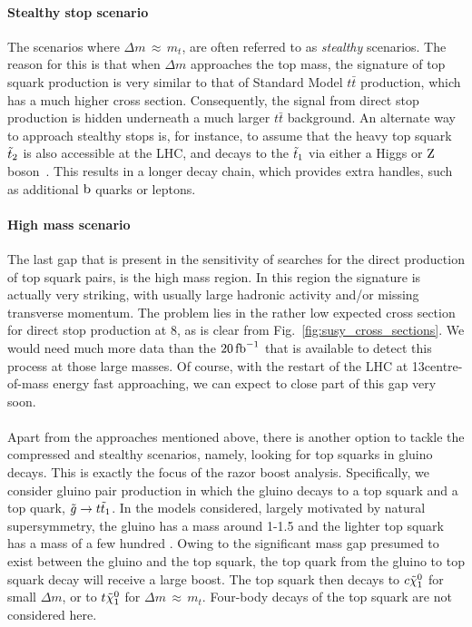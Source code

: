 \paragraph{Stealthy stop scenario}
The scenarios where $\Delta m\,{\approx}\, m_t$, are often referred to as \textit{stealthy}
scenarios. The reason for this is that when $\Delta m$ approaches the top mass, the signature of
top squark production is very similar to that of Standard Model $t\bar{t}$ production,
which has a much higher cross section. Consequently, the signal from direct stop production is
hidden underneath a much larger $t\bar{t}$ background. An alternate way to approach stealthy stops
is, for instance, to assume that the heavy top squark $\tilde{t}_2$ is also accessible at the LHC, and
decays to the $\tilde{t}_1$ via either a Higgs or $\mathrm{Z}$ boson~\cite{Khachatryan:2014doa}. This
results in a longer decay chain, which provides extra handles, such as additional $\mathrm{b}$ quarks or
leptons. 

\paragraph{High mass scenario}
The last gap that is present in the sensitivity of searches for the direct production of top squark
pairs, is the high mass region. In this region the signature is actually very striking, with
usually large hadronic activity and/or missing transverse momentum. The problem lies in the rather
low expected cross section for direct stop production at 8\TeV, as is clear from
Fig.~\ref{fig:susy_cross_sections}. We would need much more data than
the $20\mbox{\ensuremath{\,\text{fb}^\text{$-$1}}}$ that is available to detect this process at those large masses. 
Of course, with the restart of the LHC at 13\TeV centre-of-mass energy fast approaching, we can
expect to close part of this gap very soon.

\paragraph{}
Apart from the approaches mentioned above, there is another option to tackle the compressed and
stealthy scenarios, namely, looking for top squarks in gluino decays. This is exactly the focus of
the razor boost analysis. 
Specifically, we consider gluino pair production in which the gluino decays to a top squark and a
top quark, $\tilde{g} \rightarrow t \tilde{t}_1$. In the models considered, largely motivated by
natural supersymmetry, the gluino has a mass around 1-1.5 \TeV and the lighter top squark has a mass
of a few hundred \GeV. Owing to the significant mass gap presumed to exist between the gluino and
the top squark, the top quark from the gluino to top squark decay will receive a large boost.  
The top squark then decays to $c \tilde{\chi}_1^0$ for small $\Delta m$, or to $t \tilde{\chi}_1^0$ for $\Delta m
\,{\approx}\, m_t$. Four-body decays of the top squark are not considered here. 

